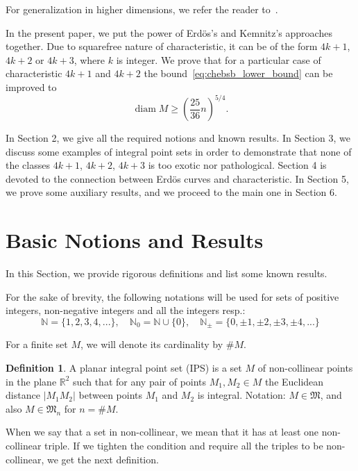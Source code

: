 \documentclass[a4paper,14pt]{article} %
\theoremstyle{plain}
\theoremstyle{definition}
\newtheorem{definition}[theorem]{Definition}
\begin{document}
	For generalization in higher dimensions, we refer the reader to~\cite{nozaki2013lower}.

	In the present paper, we put the power of Erdös's and Kemnitz's approaches together. Due to squarefree nature of characteristic, it can be of the form $4k+1$, $4k+2$ or $4k+3$, where $k$ is integer.
	We prove that for a particular case of characteristic $4k+1$ and $4k+2$
	the bound~\eqref{eq:chebsb_lower_bound} can be improved to
	\begin{equation}
		\operatorname{diam} M \ge \left( \frac{25}{36} n \right)^{5/4}
		.
	\end{equation}

	In Section 2, we give all the required notions and known results. In Section 3, we discuss some examples of integral point sets in order to demonstrate that none of the classes $4k+1$, $4k+2$, $4k+3$ is too exotic nor pathological. Section 4 is devoted to the connection between Erdös curves and characteristic. In Section 5, we prove some auxiliary results, and we proceed to the main one in Section 6.




\section{Basic Notions and Results}

In this Section, we provide rigorous definitions and list some known results.

For the sake of brevity, the following notations will be used for sets
of positive integers, non-negative integers and all the integers resp.:
\begin{equation}
	\mathbb{N} = \{1,2,3,4,...\},\quad \mathbb{N}_0 = \mathbb{N} \cup \{0\},
	\quad
	\mathbb{N}_\pm = \{0,\pm 1,\pm 2,\pm 3,\pm 4,...\}
\end{equation}

For a finite set $M$, we will denote its cardinality by $\#M$.

\begin{definition}
	\label{def:IPS}
	A planar integral point set (IPS) is a set $M$
	of non-collinear points in the plane $\mathbb{R}^{2}$ such that
	for any pair of points $M_{1}, M_{2} \in M$
	the Euclidean distance $|M_{1}M_{2}|$
	between points $M_{1}$ and $M_{2}$ is integral.
	Notation: $M\in\mathfrak{M}$, and also $M\in\mathfrak{M}_n$ for $n=\#M$.
\end{definition}

When we say that a set in non-collinear,
we mean that it has at least one non-collinear triple.
If we tighten the condition and require all the triples to be non-collinear,
we get the next definition.
\end{document}
